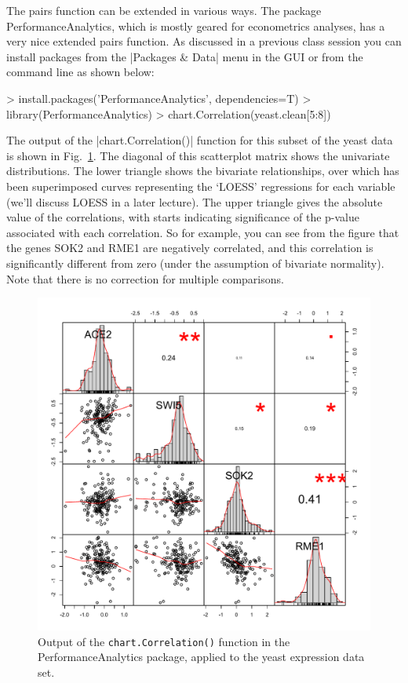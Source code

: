 The pairs function can be extended in various ways. The package PerformanceAnalytics, which is mostly geared for econometrics analyses, has a very nice extended pairs function.  As discussed in a previous class session you can install packages from the |Packages & Data| menu in the GUI or from the command line as shown below:
%
\begin{R}
> install.packages('PerformanceAnalytics', dependencies=T)
> library(PerformanceAnalytics)
> chart.Correlation(yeast.clean[5:8])
\end{R}
%
The output of the |chart.Correlation()| function for this subset of the yeast data is shown in Fig.~\ref{fig:nicepairs}. The diagonal of this scatterplot matrix shows the univariate distributions.  The lower triangle shows the bivariate relationships, over which has been superimposed curves representing the `LOESS' regressions for each variable (we'll discuss LOESS in a later lecture).  The upper triangle gives the absolute value of the correlations, with starts indicating significance of the p-value associated with each correlation. So for example, you can see from the figure that the genes SOK2 and RME1 are negatively correlated, and this correlation is significantly different from zero (under the assumption of bivariate normality). Note that there is no correction for multiple comparisons.
%
\begin{figure}[htbp]
\centering
\includegraphics[width=0.5\columnwidth]{./figures/hands-on3/nice-pairs.pdf}
\caption{Output of the \lstinline!chart.Correlation()! function in the PerformanceAnalytics package, applied to the yeast expression data set.\label{fig:nicepairs}}
\end{figure}





